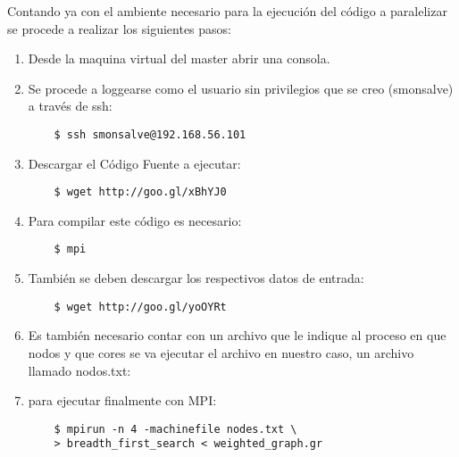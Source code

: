 Contando ya con el ambiente necesario para la ejecución del código a paralelizar se procede a realizar los siguientes pasos: 

\begin{enumerate}

	\item Desde la maquina virtual del master abrir una consola. 

	\item Se procede a loggearse como el usuario sin privilegios que se creo (smonsalve) a través de ssh:

	\begin{verbatim}
	$ ssh smonsalve@192.168.56.101
	\end{verbatim}

	\item Descargar el Código Fuente a ejecutar: 

	\begin{verbatim}
	$ wget http://goo.gl/xBhYJ0
	\end{verbatim}
	

	


	\item Para compilar este código es necesario:


	\begin{verbatim}
	$ mpi 
	\end{verbatim}
	


	\item También se deben descargar los respectivos datos de entrada: 

	\begin{verbatim}
	$ wget http://goo.gl/yoOYRt
	\end{verbatim}
	

	
	

	\item Es también necesario contar con un archivo que le indique al proceso en que nodos y que cores se va ejecutar el archivo en nuestro caso, un archivo llamado nodos.txt:

	

	\item para ejecutar finalmente con MPI: 


	\begin{verbatim}
	$ mpirun -n 4 -machinefile nodes.txt \
	> breadth_first_search < weighted_graph.gr
	\end{verbatim}
	

\end{enumerate}
